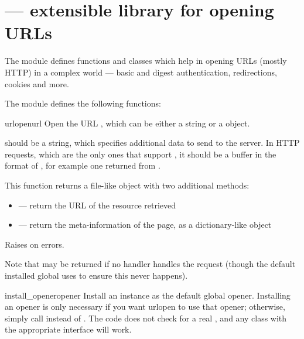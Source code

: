 \section{ ---
         extensible library for opening URLs}



The  module defines functions and classes which help
in opening URLs (mostly HTTP) in a complex world --- basic and digest
authentication, redirections, cookies and more.

The  module defines the following functions:

\begin{funcdesc}{urlopen}{url}
Open the URL , which can be either a string or a 
object.

 should be a string, which specifies additional data to
send to the server. In HTTP requests, which are the only ones that
support , it should be a buffer in the format of
, for example one returned
from .

This function returns a file-like object with two additional methods:

\begin{itemize}
  \item {} --- return the URL of the resource retrieved
  \item {} --- return the meta-information of the page, as
                            a dictionary-like object
\end{itemize}

Raises  on errors.

Note that  may be returned if no handler handles the
request (though the default installed global 
uses  to ensure this never happens).
\end{funcdesc}

\begin{funcdesc}{install_opener}{opener}
Install an  instance as the default global
opener.  Installing an opener is only necessary if you want urlopen to
use that opener; otherwise, simply call 
instead of .  The code does not check for a real
, and any class with the appropriate interface
will work.
\end{funcdesc}

